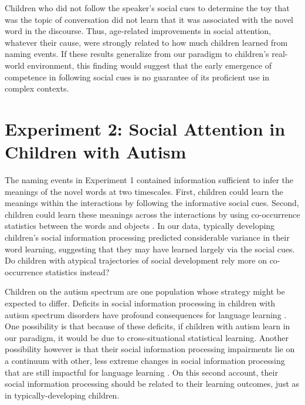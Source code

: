 \documentclass[man,floatsintext]{apa6}
\begin{document}
Children who did not follow the speaker's social cues to determine the toy that was the topic of conversation did not learn that it was associated with the novel word in the discourse. Thus, age-related improvements in social attention, whatever their cause, were strongly related to how much children learned from naming events. If these results generalize from our paradigm to children’s real-world environment, this finding would suggest that the early emergence of competence in following social cues is no guarantee of its proficient use in complex contexts.

\section{Experiment 2: Social Attention in Children with Autism}

The naming events in Experiment 1 contained information sufficient to infer the meanings of the novel words at two timescales. First, children could learn the meanings within the interactions by following the informative social cues. Second, children could learn these meanings across the interactions by using co-occurrence statistics between the words and objects \cite{smith2008}. In our data, typically developing children's social information processing predicted considerable variance in their word learning, suggesting that they may have learned largely via the social cues. Do children with atypical trajectories of social development rely more on co-occurrence statistics instead?

Children on the autism spectrum are one population whose strategy might be expected to differ. Deficits in social information processing in children with autism spectrum disorders have profound consequences for language learning \cite{baron-cohen1997,leekam1998}. One possibility is that because of these deficits, if children with autism learn in our paradigm, it would be due to cross-situational statistical learning. Another possibility however is that their social information processing impairments lie on a continuum with other, less extreme changes in social information processing that are still impactful for language learning \cite{brooks2005}. On this second account, their social information processing should be related to their learning outcomes, just as in typically-developing children.
\end{document}
